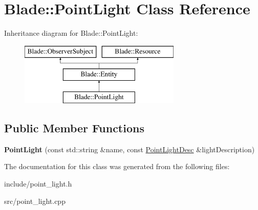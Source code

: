 \hypertarget{class_blade_1_1_point_light}{}\section{Blade\+:\+:Point\+Light Class Reference}
\label{class_blade_1_1_point_light}
Inheritance diagram for Blade\+:\+:Point\+Light\+:\begin{figure}[H]
\begin{center}
\leavevmode
\includegraphics[height=3.000000cm]{class_blade_1_1_point_light}
\end{center}
\end{figure}
\subsection*{Public Member Functions}
\begin{DoxyCompactItemize}
\item 
\mbox{\label{class_blade_1_1_point_light_a4b51a3939ac5b592075f6feb88a78366}} 
{\bfseries Point\+Light} (const std\+::string \&name, const \hyperlink{struct_blade_1_1_point_light_desc}{Point\+Light\+Desc} \&light\+Description)
\end{DoxyCompactItemize}


The documentation for this class was generated from the following files\+:\begin{DoxyCompactItemize}
\item 
include/point\+\_\+light.\+h\item 
src/point\+\_\+light.\+cpp\end{DoxyCompactItemize}
